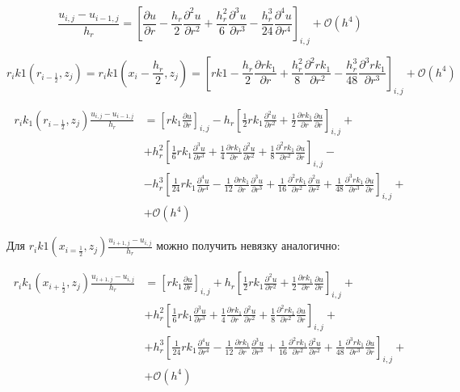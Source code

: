 \[
  \frac{u_{i,j} - u_{i - 1, j}}{h_r} = 
  \left[
    \frac{\partial u}{\partial r} - \frac{h_r}{2}\frac{\partial^2 u}{\partial r^2}
    + \frac{h^2_r}{6}\frac{\partial^3 u}{\partial r^3} - \frac{h^3_r}{24}\frac{\partial^4 u}{\partial r^4}
  \right]_{i,j}
  + \mathcal{O}(h^4)
\]

\[
  r_i k1 (r_{i - \frac{1}{2}}, z_j) = r_i k1(x_i - \frac{h_r}{2}, z_j) =
  \left[
  r k1 - \frac{h_r}{2}\frac{\partial rk_1}{\partial r}
  + \frac{h^2_r}{8}\frac{\partial^2 rk_1}{\partial r^2}
  - \frac{h^3_r}{48}\frac{\partial^3 rk_1}{\partial r^3}
  \right]_{i,j} + \mathcal{O}(h^4)
\]

\begin{align*}
  r_i k_1 (r_{i - \frac{1}{2}}, z_j) \frac{u_{i,j} - u_{i - 1, j}}{h_r} &= 
  \left[ rk_1 \frac{\partial u}{\partial r} \right]_{i, j} -
  h_r \left[ \frac{1}{2} rk_1 \frac{\partial^2 u}{\partial r^2} 
    + \frac{1}{2} \frac{\partial rk_1}{\partial r}\frac{\partial u}{\partial r}
  \right]_{i, j} +\\
  &+ h_r^2 \left[\frac{1}{6}rk_1\frac{\partial^3 u}{\partial r^3}
  + \frac{1}{4} \frac{\partial rk_1}{\partial r}\frac{\partial^2 u}{\partial r^2}
  + \frac{1}{8} \frac{\partial^2 rk_1}{\partial r^2}\frac{\partial u}{\partial r}
  \right]_{i, j} - \\
  &-h^3_r \left[
  \frac{1}{24} r k_1 \frac{\partial^4 u}{\partial r^4} - \frac{1}{12}\frac{\partial rk_1}{\partial r}\frac{\partial^3 u}{\partial r^3}
  + \frac{1}{16} \frac{\partial^2 rk_1}{\partial r^2}\frac{\partial^2 u}{\partial r^2}
  + \frac{1}{48} \frac{\partial^3 rk_1}{\partial r^3}\frac{\partial u}{\partial r}
  \right]_{i,j} +\\
  &+ \mathcal{O}(h^4)
\end{align*}

Для $ r_i k1(x_{i = \frac{1}{2}}, z_j) \frac{u_{i + 1, j} - u_{i, j}}{h_r} $ можно получить невязку аналогично:

\begin{align*}
  r_i k_1(x_{i + \frac{1}{2}}, z_j) \frac{u_{i + 1, j} - u_{i, j}}{h_r} &= 
  \left[ rk_1 \frac{\partial u}{\partial r} \right]_{i, j} +
  h_r \left[ \frac{1}{2} rk_1 \frac{\partial^2 u}{\partial r^2} 
    + \frac{1}{2} \frac{\partial rk_1}{\partial r}\frac{\partial u}{\partial r}
  \right]_{i, j} +\\
  &+ h_r^2 \left[\frac{1}{6}rk_1\frac{\partial^3 u}{\partial r^3}
  + \frac{1}{4} \frac{\partial rk_1}{\partial r}\frac{\partial^2 u}{\partial r^2}
  + \frac{1}{8} \frac{\partial^2 rk_1}{\partial r^2}\frac{\partial u}{\partial r}
  \right]_{i, j} + \\
  &+ h^3_r \left[
  \frac{1}{24} r k_1 \frac{\partial^4 u}{\partial r^4} - \frac{1}{12}\frac{\partial rk_1}{\partial r}\frac{\partial^3 u}{\partial r^3}
  + \frac{1}{16} \frac{\partial^2 rk_1}{\partial r^2}\frac{\partial^2 u}{\partial r^2}
  + \frac{1}{48} \frac{\partial^3 rk_1}{\partial r^3}\frac{\partial u}{\partial r}
  \right]_{i,j} +\\
  &+ \mathcal{O}(h^4)
\end{align*}

